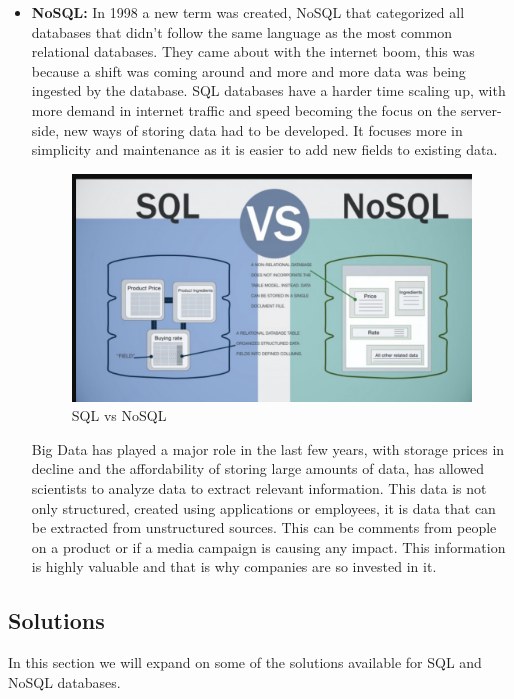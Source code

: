 \begin{itemize}
{	}
	\item {\textbf{NoSQL:} In 1998 a new term was created, NoSQL that categorized all databases that didn’t follow the same language as the most common relational databases. They came about with the internet boom, this was because a shift was coming around and more and more data was being ingested by the database. SQL databases have a harder time scaling up, with more demand in internet traffic and speed becoming the focus on the server-side, new ways of storing data had to be developed. It focuses more in simplicity and maintenance as it is easier to add new fields to existing data. 
	\begin{center}
		\begin{figure}[h!]
			\centering
			\includegraphics[scale=0.3]{./images/3-nosql}
			\caption{SQL vs NoSQL}
			\label{nosql}
		\end{figure}
	\end{center}
	Big Data has played a major role in the last few years, with storage prices in decline and the affordability of storing large amounts of data, has allowed scientists to analyze data to extract relevant information. This data is not only structured, created using applications or employees, it is data that can be extracted from unstructured sources. This can be comments from people on a product or if a media campaign is causing any impact. This information is highly valuable and that is why companies are so invested in it.\cite{db-hist}
	}
\end{itemize}
\clearpage
\subsection{Solutions}\label{sec:chap3_db_sol}
In this section we will expand on some of the solutions available for SQL and NoSQL databases.

